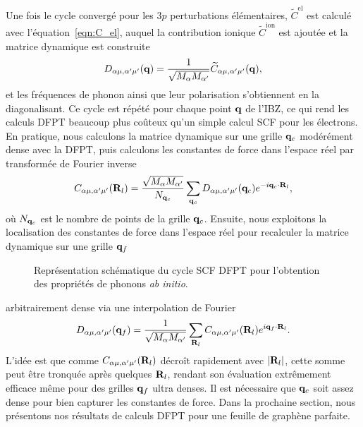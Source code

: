 Une fois le cycle convergé pour les $3p$ perturbations élémentaires, $\widetilde{C}^\text{el}$ est calculé avec l'équation~\eqref{eqn:C_el}, auquel la contribution ionique $\widetilde{C}^\text{ion}$ est ajoutée et la matrice dynamique est construite
\begin{equation}
    D_{\alpha\mu,\alpha'\mu'}(\mathbf{q})=\frac{1}{\sqrt{M_\alpha M_{\alpha'}}}\widetilde{C}_{\alpha\mu,\alpha'\mu'}(\mathbf{q}),
\end{equation}
et les fréquences de phonon ainsi que leur polarisation s'obtiennent en la diagonalisant. Ce cycle est répété pour chaque point $\mathbf{q}$ de l'IBZ, ce qui rend les calculs DFPT beaucoup plus coûteux qu'un simple calcul SCF pour les électrons. En pratique, nous calculons la matrice dynamique sur une grille $\mathbf{q}_c$ modérément dense avec la DFPT, puis calculons les constantes de force dans l'espace réel par transformée de Fourier inverse
\begin{equation}
    C_{\alpha\mu,\alpha'\mu'}(\mathbf{R}_l) =\frac{\sqrt{M_\alpha M_{\alpha'}}}{N_{\mathbf{q}_c}}\sum_{\mathbf{q}_c}D_{\alpha\mu,\alpha'\mu'}(\mathbf{q}_c)e^{-i\mathbf{q}_c\cdot\mathbf{R}_l},
\end{equation}
où $N_{\mathbf{q}_c}$ est le nombre de points de la grille $\mathbf{q}_c$. Ensuite, nous exploitons la localisation des constantes de force dans l'espace réel pour recalculer la matrice dynamique sur une grille $\mathbf{q}_f$
\clearpage
\vspace*{\fill}
\begin{figure}[H]
    \centering
    
    \caption[Représentation schématique du cycle SCF DFPT pour l'obtention des propriétés de phonons \textit{ab initio}.]{Représentation schématique du cycle SCF DFPT pour l'obtention des propriétés de phonons \textit{ab initio}.}
    \label{fig:scf_phonon}
\end{figure}
\vspace*{\fill}
\clearpage
\noindent
arbitrairement dense via une interpolation de Fourier
\begin{equation}
    D_{\alpha\mu,\alpha'\mu'}(\mathbf{q}_f)=\frac{1}{\sqrt{M_\alpha M_{\alpha'}}}\sum_{\mathbf{R}_l}C_{\alpha\mu,\alpha'\mu'}(\mathbf{R}_l)e^{i\mathbf{q}_f\cdot\mathbf{R}_l}.
\end{equation}
L'idée est que comme $C_{\alpha\mu,\alpha'\mu'}(\mathbf{R}_l)$ décroît rapidement avec $|\mathbf{R}_l|$, cette somme peut être tronquée après quelques $\mathbf{R}_l$, rendant son évaluation extrêmement efficace même pour des grilles $\mathbf{q}_f$ ultra denses. Il est nécessaire que $\mathbf{q}_c$ soit assez dense pour bien capturer les constantes de force. Dans la prochaine section, nous présentons nos résultats de calculs DFPT pour une feuille de graphène parfaite.

